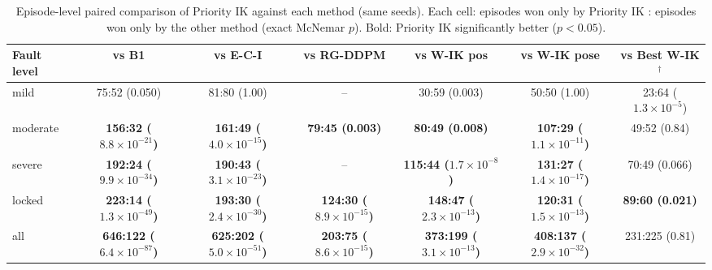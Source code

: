 \begin{table}[t]
\centering
\caption{Episode-level paired comparison of Priority IK against each method (same seeds). Each cell: episodes won only by Priority IK : episodes won only by the other method (exact McNemar $p$). Bold: Priority IK significantly better ($p<0.05$).}
\label{tab:paired}
\setlength{\tabcolsep}{3pt}
\begin{tabular}{lcccccc}
\toprule
Fault level & vs B1 & vs E-C-I & vs RG-DDPM & vs W-IK pos & vs W-IK pose & vs Best W-IK$^\dagger$ \\
\midrule
mild & 75:52 (0.050) & 81:80 (1.00) & -- & 30:59 (0.003) & 50:50 (1.00) & 23:64 ($1.3\times10^{-5}$) \\
moderate & \textbf{156:32 ($8.8\times10^{-21}$)} & \textbf{161:49 ($4.0\times10^{-15}$)} & \textbf{79:45 (0.003)} & \textbf{80:49 (0.008)} & \textbf{107:29 ($1.1\times10^{-11}$)} & 49:52 (0.84) \\
severe & \textbf{192:24 ($9.9\times10^{-34}$)} & \textbf{190:43 ($3.1\times10^{-23}$)} & -- & \textbf{115:44 ($1.7\times10^{-8}$)} & \textbf{131:27 ($1.4\times10^{-17}$)} & 70:49 (0.066) \\
locked & \textbf{223:14 ($1.3\times10^{-49}$)} & \textbf{193:30 ($2.4\times10^{-30}$)} & \textbf{124:30 ($8.9\times10^{-15}$)} & \textbf{148:47 ($2.3\times10^{-13}$)} & \textbf{120:31 ($1.5\times10^{-13}$)} & \textbf{89:60 (0.021)} \\
all & \textbf{646:122 ($6.4\times10^{-87}$)} & \textbf{625:202 ($5.0\times10^{-51}$)} & \textbf{203:75 ($8.6\times10^{-15}$)} & \textbf{373:199 ($3.1\times10^{-13}$)} & \textbf{408:137 ($2.9\times10^{-32}$)} & 231:225 (0.81) \\
\bottomrule
\end{tabular}
\end{table}
